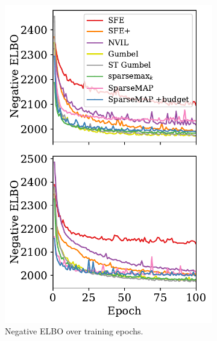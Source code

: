 \begin{figure}[ht]
    \centering
    \begin{subfigure}[b]{0.35\textwidth}
        \centering
        \includegraphics[width=\textwidth]{Figures/elbo-bit-vector.pdf}
        \caption{Negative ELBO over training epochs.}
        \label{fig:elbo_bit_epochs}
    \end{subfigure}
    \begin{subfigure}[b]{0.35\textwidth}
        \centering

\end{subfigure}
\end{figure}
